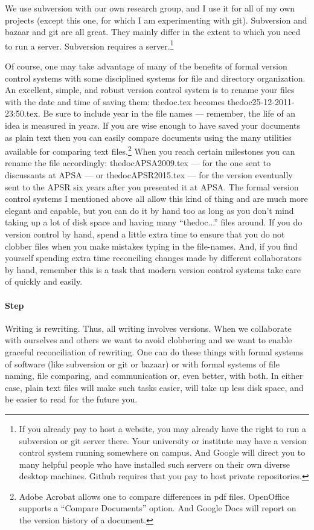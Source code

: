 \documentclass[12pt]{article}
\begin{document}
We use subversion with our own research group, and I use it for all of
my own projects (except this one, for which I am experimenting with
git). Subversion and bazaar and git are all great. They mainly differ
in the extent to which you need to run a server. Subversion requires a
server.\footnote{If you already pay to host a website, you may already
  have the right to run a subversion or git server there. Your
  university or institute may have a version control system running
  somewhere on campus. And Google will direct you to many helpful
  people who have installed such servers on their own diverse desktop
  machines. Github requires that you pay to host private
  repositories.}

Of course, one may take advantage of many of the benefits of formal
version control systems with some disciplined systems for file and
directory organization.  An excellent, simple, and robust version
control system is to rename your files with the date and time of
saving them: thedoc.tex becomes thedoc25-12-2011-23:50.tex.  Be sure
to include year in the file names --- remember, the life of an idea is
measured in years. If you are wise enough to have saved your documents
as plain text then you can easily compare documents using the many
utilities available for comparing text files.\footnote{Adobe Acrobat
  allows one to compare differences in pdf files. OpenOffice supports
  a ``Compare Documents'' option. And Google Docs will report on the
  version history of a document.} When you reach certain milestones
you can rename the file accordingly: thedocAPSA2009.tex --- for the
one sent to discussants at APSA --- or thedocAPSR2015.tex --- for the
version eventually sent to the APSR six years after you presented it
at APSA. The formal version control systems I mentioned above all
allow this kind of thing and are much more elegant and capable, but
you can do it by hand too as long as you don't mind taking up a lot of
disk space and having many ``thedoc...''  files around. If you do
version control by hand, spend a little extra time to ensure that you
do not clobber files when you make mistakes typing in the
file-names. And, if you find yourself spending extra time reconciling
changes made by different collaborators by hand, remember this is a
task that modern version control systems take care of quickly and
easily.


\paragraph{Step \thesection} Writing is rewriting. Thus, all writing
involves versions. When we collaborate with ourselves and others we
want to avoid clobbering and we want to enable graceful reconciliation
of rewriting. One can do these things with formal systems of software
(like subversion or git or bazaar) or with formal systems of file
naming, file comparing, and communication or, even better, with
both. In either case, plain text files will make such tasks easier,
will take up less disk space, and be easier to read for the future
you.
\end{document}
